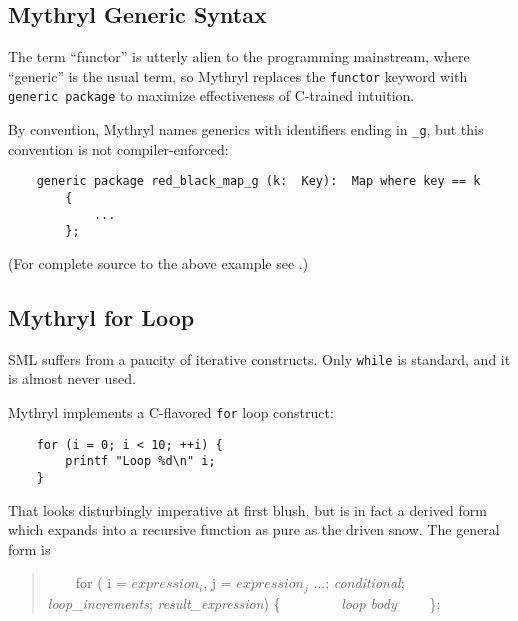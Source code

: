\subsection{Mythryl Generic Syntax}

The term ``functor'' is utterly alien to the programming mainstream, where 
``generic'' is the usual term, so  
Mythryl replaces the {\tt functor} keyword with {\tt generic package} 
to maximize effectiveness of C-trained intuition.

By convention, Mythryl names generics with identifiers ending in 
{\tt \_g}, but this convention is not compiler-enforced:

\begin{verbatim}
    generic package red_black_map_g (k:  Key):  Map where key == k
        {
            ...
        };
\end{verbatim}

(For complete source to the above example see 
.)

\cutend*

\subsection{Mythryl for Loop}

{\sc SML} suffers from a paucity of iterative constructs.  Only {\tt while} is 
standard, and it is almost never used.

Mythryl implements a C-flavored {\tt for} loop construct:

\begin{verbatim}
    for (i = 0; i < 10; ++i) {
        printf "Loop %d\n" i;
    }
\end{verbatim}

That looks disturbingly imperative at first blush, but is in fact 
a derived form which expands into a recursive function as pure as 
the driven snow.  The general form is

\begin{quotation}
~~~~for ( {i = $expression_i$}, j = $expression_j$ ...; {\it conditional};  {\it loop\_increments};  {\it result\_expression}) \{ \newline
~~~~~~~~{\it loop body} \newline
~~~~\}; \newline
\end{quotation}

